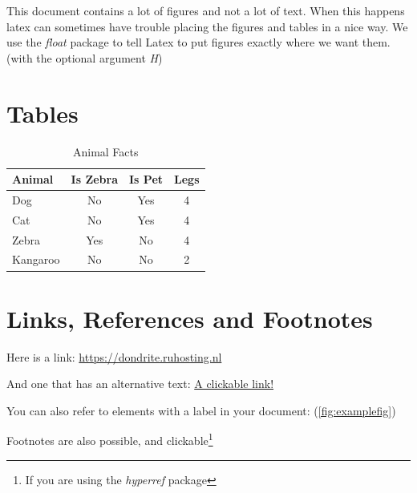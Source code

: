 \documentclass[12pt]{scrarticle}
\begin{document}
This document contains a lot of figures and not a lot of text. When this happens latex can sometimes have trouble placing the figures and tables in a nice way. We use the \textit{float} package to tell Latex to put figures exactly where we want them. (with the optional argument \textit{H})

\section{Tables}

\begin{table}[H]
    \centering
    \begin{tabular}{|l||c|c|c|}
    \hline 
    Animal & Is Zebra & Is Pet & Legs\\
    \hline\hline
    Dog         & No    & Yes   & 4\\
    Cat         & No    & Yes   & 4\\
    Zebra       & Yes   & No    & 4\\
    Kangaroo    & No    & No    & 2\\
    \hline
    \end{tabular}
    \caption{Animal Facts}
    \label{tab:my_label}
\end{table}

\section{Links, References and Footnotes}

Here is a link: \url{https://dondrite.ruhosting.nl}

And one that has an alternative text: \href{https://www.youtube.com/watch?v=dQw4w9WgXcQ}{A clickable link!}

You can also refer to elements with a label in your document: (\ref{fig:examplefig})

Footnotes are also possible, and clickable\footnote{If you are using the \textit{hyperref} package}
\end{document}
